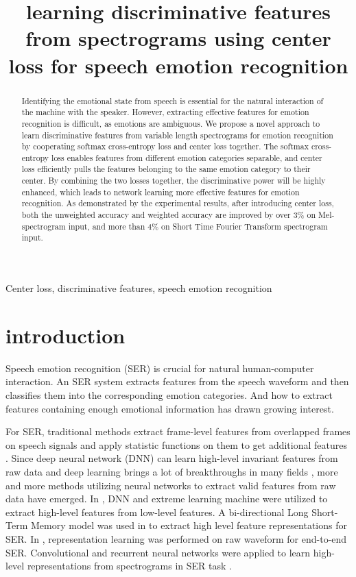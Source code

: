 \documentclass{article}
\title{learning discriminative features from spectrograms using center loss for speech emotion recognition}
\begin{document}
%
\maketitle
%
\begin{abstract}
Identifying the emotional state from speech is essential for the natural interaction of the machine with the speaker. However, extracting effective features for emotion recognition is difficult, as emotions are ambiguous. We propose a novel approach to learn discriminative features from variable length spectrograms for emotion recognition by cooperating softmax cross-entropy loss and center loss together. The softmax cross-entropy loss enables features from different emotion categories separable, and center loss efficiently pulls the features belonging to the same emotion category to their center. By combining the two losses together, the discriminative power will be highly enhanced, which leads to network learning more effective features for emotion recognition. As demonstrated by the experimental results, after introducing center loss, both the unweighted accuracy and weighted accuracy are improved by over 3\% on Mel-spectrogram input, and more than 4\% on Short Time Fourier Transform spectrogram input.
\end{abstract}
%
\begin{keywords}
Center loss, discriminative features, speech emotion recognition
\end{keywords}
%
\section{introduction}

Speech emotion recognition (SER) is crucial for natural human-computer interaction. An SER system extracts features from the speech waveform and then classifies them into the corresponding emotion categories. And how to extract features containing enough emotional information has drawn growing interest.

For SER, traditional methods extract frame-level features from overlapped frames on speech signals and apply statistic functions on them to get additional features \cite{el2011survey}. Since deep neural network (DNN) can learn high-level invariant features from raw data \cite{bengio2013representation} and deep learning brings a lot of breakthroughs in many fields \cite{lecun2015deep}, more and more methods utilizing neural networks to extract valid features from raw data have emerged. In \cite{han2014speech}, DNN and extreme learning machine were utilized to extract high-level features from low-level features. A bi-directional Long Short-Term Memory model was used in \cite{lee2015high}  to extract high level feature representations for SER. In \cite{trigeorgis2016adieu}, representation learning was performed on raw waveform for end-to-end SER. Convolutional and recurrent neural networks were applied to learn high-level representations from spectrograms in SER task \cite{satt2017efficient}.
\end{document}
